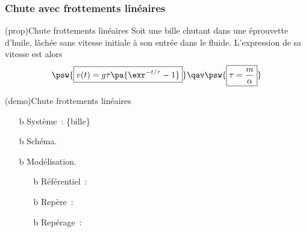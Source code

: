 \documentclass[../../main/main.tex]{subfiles}
\begin{document}
\subsubsection{Chute avec frottements linéaires}
\begin{tcb*}(prop){Chute frottements linéaires}
	Soit une bille chutant dans une éprouvette d'huile, lâchée sans vitesse
	initiale à son entrée dans le fluide. L'expression de sa vitesse est alors
	\[
		\psw{%
			\boxed{v(t) = g\tau \pa{\exr^{-t/\tau}-1}}
		}%
		\qav
		\psw{%
			\boxed{\tau = \frac{m}{\alpha}}
		}%
	\]
\end{tcb*}
\begin{tcb*}(demo){Chute frottements linéaires}
	\begin{isd}[righthand ratio=.3, sidebyside align=top]
		\begin{enumerate}[label=\sqenumi]
			\item[b]{Système}~: \{bille\}
			\item[b]{Schéma.}
			\item[b]{Modélisation.}
			      \begin{itemize}
				      \item[b]{Référentiel}~: 
				      \item[b]{Repère}~: %
				      \item[b]{Repérage}~:
				            \vspace{-25pt}
			      \end{itemize}
		\end{enumerate}
		\tcblower
		\begin{center}
			\vspace{-12pt}
			\sswitch{%
}
\end{center}
\end{isd}
\end{tcb*}
\end{document}
